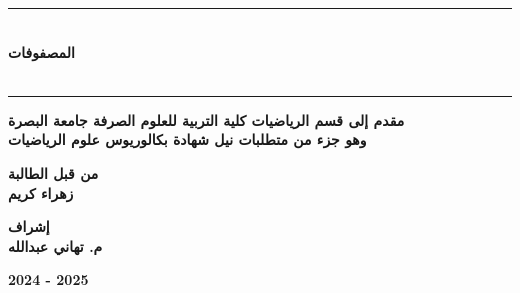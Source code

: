 \begin{titlepage}
	\vspace{1cm}
	
	\begin{center}
		\rule{100mm}{0.5mm}\\
		\vspace{1cm}
		\Large \textbf{المصفوفات}\\
		\Large \textbf{}\\
		\vspace{12pt}
		\rule{100mm}{0.5mm}
	\end{center}
	\vfill
	\begin{center}
		\large
		\textbf{مقدم إلى قسم الرياضيات كلية التربية للعلوم الصرفة جامعة البصرة\\
			\vspace{6pt}
			وهو جزء من متطلبات نيل شهادة بكالوريوس علوم الرياضيات}
	\end{center}
	\vfill
	\begin{center}
		\large
		\textbf{من قبل الطالبة}\\
		\vspace{8pt}
		 \large
		\textbf{زهراء كريم}
	\end{center}
	\vspace{10pt}
	\begin{center}
		\large
		\textbf{إشراف}\\
		\vspace{8pt}
		 \large
		\textbf{م. تهاني عبدالله}
	\end{center}
	\vspace{10pt}
	\begin{center}
		\large 
		\textbf{2024 - 2025}
	\end{center}
\end{titlepage}
